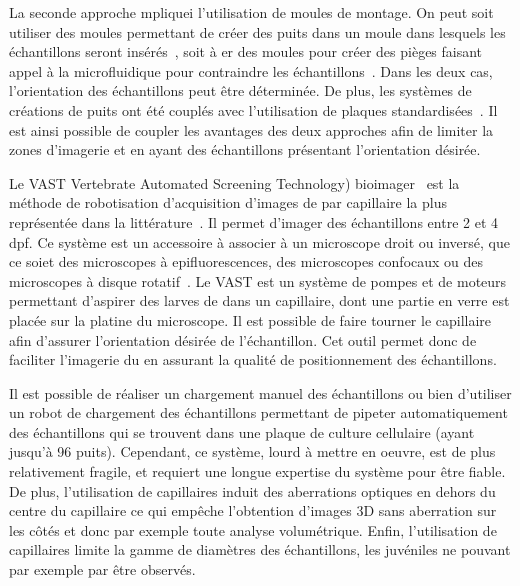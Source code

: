 \documentclass[\main/main.tex]{subfiles}
\begin{document}
%
\label{sec:moule_montage}
La seconde approche mpliquei l'utilisation de moules de montage.
%
On peut soit utiliser des moules permettant de créer des puits dans un moule dans lesquels les échantillons seront insérés~\cite{donoughe_2018,kleinhans_2019}, soit à er des moules pour créer des pièges faisant appel à la microfluidique pour contraindre les échantillons~\cite{khalili_2019}. Dans les deux cas, l'orientation des échantillons peut être déterminée.
%
De plus, les systèmes de créations de puits ont été couplés avec l'utilisation de plaques standardisées~\cite{wittbrodt_2014}.
%
Il est ainsi possible de coupler les avantages des deux approches afin de limiter la zones d'imagerie et en ayant des échantillons présentant l'orientation désirée.

\label{sec:vast}
Le VAST Vertebrate Automated Screening Technology) bioimager~\cite{pardomartin_2010} est la méthode de robotisation d'acquisition d'images de \pz{} par capillaire la plus représentée dans la littérature~\cite{jarque_2018,teixid_2019}. Il permet d'imager des échantillons entre 2 et 4 dpf.
%
Ce système est un accessoire à associer à un microscope droit ou inversé, que ce soiet des microscopes à epifluorescences, des microscopes confocaux ou des microscopes à disque rotatif~\cite{early_2018, guo_2017}.
%
Le VAST est un système de pompes et de moteurs permettant d'aspirer des larves de \pz{} dans un capillaire, dont une partie en verre est placée sur la platine du microscope. 
%
Il est possible de faire tourner le capillaire afin d'assurer l'orientation désirée de l'échantillon.
%
Cet outil permet donc de faciliter l'imagerie du \pz{} en assurant la qualité de positionnement des échantillons.

%
Il est possible de réaliser un chargement manuel des échantillons ou bien d'utiliser un robot de chargement des échantillons permettant de pipeter automatiquement des échantillons qui se trouvent dans une plaque de culture cellulaire (ayant jusqu'à 96 puits).
%
Cependant, ce système, lourd à mettre en oeuvre, est de plus relativement fragile, et requiert une longue expertise du système pour être fiable.
De plus, l'utilisation de capillaires induit des aberrations optiques en dehors du centre du capillaire ce qui empêche l'obtention d'images 3D sans aberration sur les côtés et donc par exemple toute analyse volumétrique. Enfin, l'utilisation de capillaires limite la gamme de diamètres des échantillons, les juvéniles ne pouvant par exemple par être observés.
\end{document}
